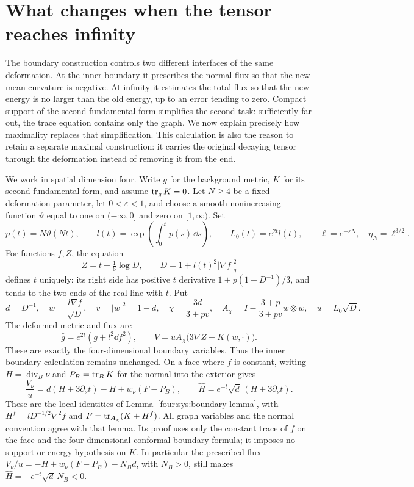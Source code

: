 \section{What changes when the tensor reaches infinity}
\label{b:transition}

The boundary construction controls two different interfaces of the same
deformation.  At the inner boundary it prescribes the normal flux so that
the new mean curvature is negative.  At infinity it estimates the total
flux so that the new energy is no larger than the old energy, up to an
error tending to zero.  Compact support of the second fundamental form
simplifies the second task: sufficiently far out, the trace equation
contains only the graph.  We now explain precisely how maximality replaces
that simplification.  This calculation is also the reason to retain a
separate maximal construction: it carries the original decaying tensor
through the deformation instead of removing it from the end.

We work in spatial dimension four.  Write $g$ for the background metric,
$K$ for its second fundamental form, and assume $\operatorname{tr}_gK=0$.
Let $N\ge4$ be a fixed deformation parameter, let $0<\varepsilon<1$,
and choose a smooth nonincreasing function $\vartheta$ equal to one on
$(-\infty,0]$ and zero on $[1,\infty)$.  Set
\[
 p(t)=N\vartheta(Nt),\qquad
 l(t)=\exp\!\left(\int_0^t p(s)\,\dd s\right),\qquad
 L_0(t)=e^{2t}l(t),\qquad
 \ell=e^{-\varepsilon N},\quad \eta_N=\ell^{3/2}.
\]
For functions $f,Z$, the equation
\[
 Z=t+\tfrac16\log D,\qquad D=1+l(t)^2|\nabla f|_g^2
\]
defines $t$ uniquely: its right side has positive $t$ derivative
$1+p(1-D^{-1})/3$, and tends to the two ends of the real line with $t$.
Put
\[
 d=D^{-1},\quad w=\frac{l\nabla f}{\sqrt D},\quad v=|w|^2=1-d,
 \quad\chi=\frac{3d}{3+pv},\quad
 A_\chi=I-\frac{3+p}{3+pv}w\otimes w,
 \quad u=L_0\sqrt D.
\]
The deformed metric and flux are
\[
 \widehat g=e^{2t}(g+l^2\dd f^2),\qquad
 V=uA_\chi\bigl(3\nabla Z+K(w,\cdot)\bigr).
\]
These are exactly the four-dimensional boundary variables.  Thus the
inner boundary calculation remains unchanged.  On a face where $f$ is
constant, writing $H=\operatorname{div}_B\nu$ and $P_B=\operatorname{tr}_BK$ for
the normal into the exterior gives
\begin{equation}\label{b:transition:boundary}
 \frac{V_\nu}{u}
 =d(H+3\partial_\nu t)-H+w_\nu(F-P_B),
 \qquad
 \widehat H=e^{-t}\sqrt d\,(H+3\partial_\nu t).
\end{equation}
These are the local identities of
Lemma~\ref{four:sys:boundary-lemma}, with
$H^f=lD^{-1/2}\nabla^2f$ and $F=\operatorname{tr}_{A_\chi}(K+H^f)$.
All graph variables and the normal convention agree with that lemma.
Its proof uses only the constant trace of $f$ on the face and the
four-dimensional conformal boundary formula; it imposes no support
or energy hypothesis on $K$.
In particular the prescribed flux
$V_\nu/u=-H+w_\nu(F-P_B)-N_Bd$, with $N_B>0$, still makes
$\widehat H=-e^{-t}\sqrt d\,N_B<0$.

